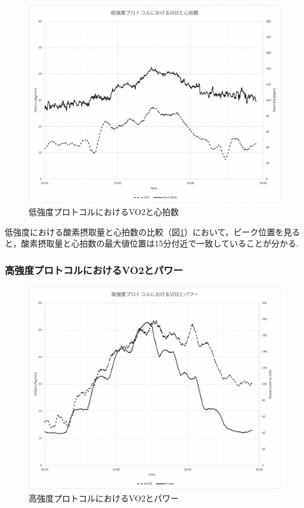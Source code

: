 \begin{figure}[H]
  \begin{center}
    \includegraphics[width=12cm]{fig/light_vo2_hr}
    \caption{低強度プロトコルにおけるVO2と心拍数}
    \label{fig:light_vo2_hr}
  \end{center}
\end{figure}

低強度における酸素摂取量と心拍数の比較（図\ref{fig:light_vo2_hr}）において，ピーク位置を見ると，酸素摂取量と心拍数の最大値位置は15分付近で一致していることが分かる.

\subsubsection{高強度プロトコルにおけるVO2とパワー}

\begin{figure}[H]
  \begin{center}
    \includegraphics[width=12cm]{fig/hard_vo2_power}
    \caption{高強度プロトコルにおけるVO2とパワー}
    \label{fig:hard_vo2_power}
  \end{center}
\end{figure}

